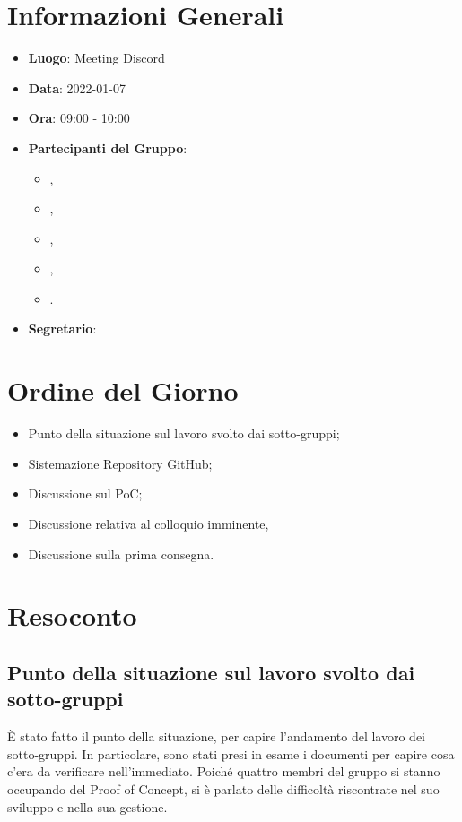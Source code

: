 \section{Informazioni Generali}

\begin{itemize}
\item{\textbf{Luogo}}: Meeting Discord
\item{\textbf{Data}}: 2022-01-07
\item{\textbf{Ora}}: 09:00 - 10:00
\item{\textbf{Partecipanti del Gruppo}}: 
	\begin{itemize}
	\item{\EP{},} 
	\item{\FP{},}
	\item{\GC{},}
	\item{\LW{},}
	\item{\MB{}.}
	\end{itemize} 
\item{\textbf{Segretario}}: \GC{}	
\end{itemize}

\section{Ordine del Giorno}
\begin{itemize}
\item{Punto della situazione sul lavoro svolto dai sotto-gruppi;}
\item{Sistemazione Repository GitHub;}
\item{Discussione sul PoC;}
\item{Discussione relativa al colloquio imminente,}
\item{Discussione sulla prima consegna.}
\end{itemize}

\section{Resoconto}

\subsection{Punto della situazione sul lavoro svolto dai sotto-gruppi}

È stato fatto il punto della situazione, per capire l'andamento del lavoro dei sotto-gruppi. In particolare, sono stati presi in esame i documenti per capire cosa c'era da verificare nell'immediato.
Poiché quattro membri del gruppo si stanno occupando del Proof of Concept, si è parlato delle difficoltà riscontrate nel suo sviluppo e nella sua gestione.     

